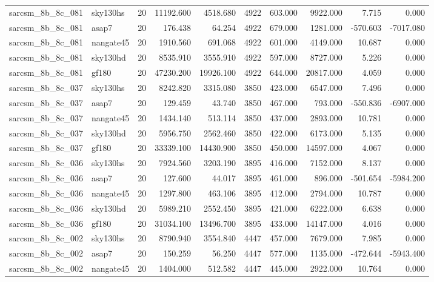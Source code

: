 \begin{tabular}{llrrrrrrrr}
sarcsm\_8b\_8c\_081 & sky130hs & 20 & 11192.600 & 4518.680 & 4922 & 603.000 & 9922.000 & 7.715 & 0.000 \\
sarcsm\_8b\_8c\_081 & asap7 & 20 & 176.438 & 64.254 & 4922 & 679.000 & 1281.000 & -570.603 & -7017.080 \\
sarcsm\_8b\_8c\_081 & nangate45 & 20 & 1910.560 & 691.068 & 4922 & 601.000 & 4149.000 & 10.687 & 0.000 \\
sarcsm\_8b\_8c\_081 & sky130hd & 20 & 8535.910 & 3555.910 & 4922 & 597.000 & 8727.000 & 5.226 & 0.000 \\
sarcsm\_8b\_8c\_081 & gf180 & 20 & 47230.200 & 19926.100 & 4922 & 644.000 & 20817.000 & 4.059 & 0.000 \\
sarcsm\_8b\_8c\_037 & sky130hs & 20 & 8242.820 & 3315.080 & 3850 & 423.000 & 6547.000 & 7.496 & 0.000 \\
sarcsm\_8b\_8c\_037 & asap7 & 20 & 129.459 & 43.740 & 3850 & 467.000 & 793.000 & -550.836 & -6907.000 \\
sarcsm\_8b\_8c\_037 & nangate45 & 20 & 1434.140 & 513.114 & 3850 & 437.000 & 2893.000 & 10.781 & 0.000 \\
sarcsm\_8b\_8c\_037 & sky130hd & 20 & 5956.750 & 2562.460 & 3850 & 422.000 & 6173.000 & 5.135 & 0.000 \\
sarcsm\_8b\_8c\_037 & gf180 & 20 & 33339.100 & 14430.900 & 3850 & 450.000 & 14597.000 & 4.067 & 0.000 \\
sarcsm\_8b\_8c\_036 & sky130hs & 20 & 7924.560 & 3203.190 & 3895 & 416.000 & 7152.000 & 8.137 & 0.000 \\
sarcsm\_8b\_8c\_036 & asap7 & 20 & 127.600 & 44.017 & 3895 & 461.000 & 896.000 & -501.654 & -5984.200 \\
sarcsm\_8b\_8c\_036 & nangate45 & 20 & 1297.800 & 463.106 & 3895 & 412.000 & 2794.000 & 10.787 & 0.000 \\
sarcsm\_8b\_8c\_036 & sky130hd & 20 & 5989.210 & 2552.450 & 3895 & 421.000 & 6222.000 & 6.638 & 0.000 \\
sarcsm\_8b\_8c\_036 & gf180 & 20 & 31034.100 & 13496.700 & 3895 & 433.000 & 14147.000 & 4.016 & 0.000 \\
sarcsm\_8b\_8c\_002 & sky130hs & 20 & 8790.940 & 3554.840 & 4447 & 457.000 & 7679.000 & 7.985 & 0.000 \\
sarcsm\_8b\_8c\_002 & asap7 & 20 & 150.259 & 56.250 & 4447 & 577.000 & 1135.000 & -472.644 & -5943.400 \\
sarcsm\_8b\_8c\_002 & nangate45 & 20 & 1404.000 & 512.582 & 4447 & 445.000 & 2922.000 & 10.764 & 0.000 \\

\end{tabular}
